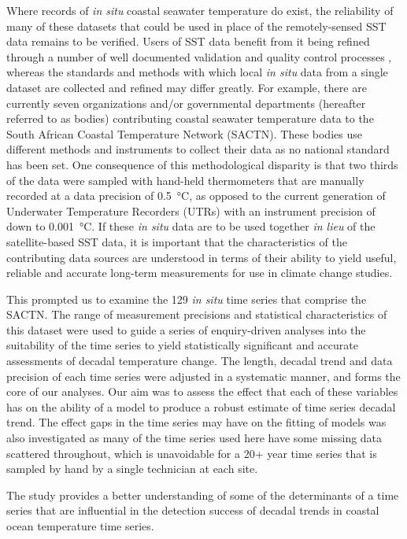 \documentclass[]{ametsoc}
\begin{document}
Where records of \emph{in situ} coastal seawater temperature do exist, the reliability of many of these datasets that could be used in place of the remotely-sensed SST data remains to be verified. Users of SST data benefit from it being refined through a number of well documented validation and quality control processes \citep[e.g.][]{Reynolds1994, Brown1999, Martin2012}, whereas the standards and methods with which local \emph{in situ} data from a single dataset are collected and refined may differ greatly. For example, there are currently seven organizations and/or governmental departments (hereafter referred to as bodies) contributing coastal seawater temperature data to the South African Coastal Temperature Network (SACTN). These bodies use different methods and instruments to collect their data as no national standard has been set. One consequence of this methodological disparity is that two thirds of the data were sampled with hand-held thermometers that are manually recorded at a data precision of \SI{0.5}{\degreeCelsius}, as opposed to the current generation of Underwater Temperature Recorders (UTRs) with an instrument precision of down to \SI{0.001}{\degreeCelsius}. If these \emph{in situ} data are to be used together \emph{in lieu} of the satellite-based SST data, it is important that the characteristics of the contributing data sources are understood in terms of their ability to yield useful, reliable and accurate long-term measurements for use in climate change studies.

This prompted us to examine the 129 \emph{in situ} time series that comprise the SACTN. The range of measurement precisions and statistical characteristics of this dataset were used to guide a series of enquiry-driven analyses into the suitability of the time series to yield statistically significant and accurate assessments of decadal temperature change. The length, decadal trend and data precision of each time series were adjusted in a systematic manner, and forms the core of our analyses. Our aim was to assess the effect that each of these variables has on the ability of a model to produce a robust estimate of time series decadal trend. The effect gaps in the time series may have on the fitting of models was also investigated as many of the time series used here have some missing data scattered throughout, which is unavoidable for a 20+ year time series that is sampled by hand by a single technician at each site.

The study provides a better understanding of some of the determinants of a time series that are influential in the detection success of decadal trends in coastal ocean temperature time series.
\end{document}
